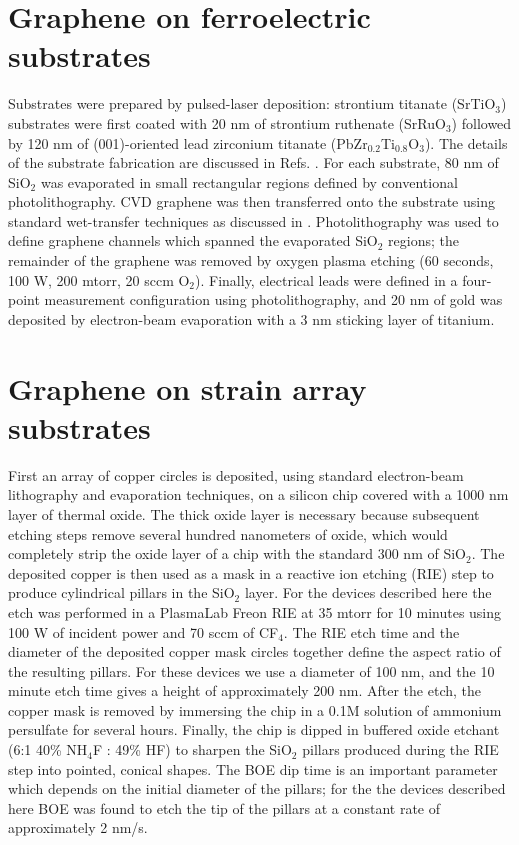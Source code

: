 \documentclass[edeposit,fullpage,draftthesis]{uiucthesis2009}
\begin{document}
\begin{appendices}
\section{Graphene on ferroelectric substrates}

Substrates were prepared by pulsed-laser deposition: strontium titanate (SrTiO$_3$) substrates were first coated with 20 nm of strontium ruthenate (SrRuO$_3$) followed by 120 nm of (001)-oriented lead zirconium titanate (PbZr$_{0.2}$Ti$_{0.8}$O$_3$). The details of the substrate fabrication are discussed in Refs. 
\cite{Xu2014,Karthik2012}.
For each substrate, 80 nm of SiO$_2$ was evaporated in small rectangular regions defined by conventional photolithography. CVD graphene was then transferred onto the substrate using standard wet-transfer techniques as discussed in \cite{Li2009}.
Photolithography was used to define graphene channels which spanned the evaporated SiO$_2$ regions; 
the remainder of the graphene was removed by oxygen plasma etching (60 seconds, 100 W, 200 mtorr, 20 sccm O$_2$). 
Finally, electrical leads were defined in a four-point measurement configuration using photolithography, and 20 nm of gold was deposited by electron-beam evaporation with a 3 nm sticking layer of titanium.

\section{Graphene on strain array substrates}

            First an array of copper circles is deposited, using standard electron-beam lithography and evaporation techniques, 
            on a silicon chip covered with a 1000 nm layer of thermal oxide. 
            The thick oxide layer is necessary because subsequent etching steps remove several hundred nanometers of oxide, 
            which would completely strip the oxide layer of a chip with the standard 300 nm of SiO$_2$.
            The deposited copper is then used as a mask in a reactive ion etching 
            (RIE) step to produce cylindrical pillars in the SiO$_2$ layer. 
            For the devices described here the etch was performed in 
            a PlasmaLab Freon RIE at 35 mtorr for 10 minutes 
            using 100 W of incident power and 70 sccm of CF$_4$. 
            The RIE etch time and the diameter of the deposited copper mask circles together 
            define the aspect ratio of the resulting 
            pillars. For these devices we use a diameter of 100 nm, and the 10 minute etch 
            time gives a height of approximately 200 nm.
            After the etch, the copper mask is removed by immersing the chip 
            in a 0.1M solution of ammonium persulfate for several hours. Finally, the chip is dipped in buffered oxide etchant 
            (6:1 40\% NH$_4$F : 49\% HF) to sharpen the SiO$_2$ pillars produced during the RIE step into pointed, conical shapes. 
            The BOE dip time is an important parameter which depends on the initial diameter of the pillars; for the the devices
            described here BOE was found to etch the tip of the pillars at a constant rate of approximately 2 nm/s. 
            

\end{appendices}
\end{document}
